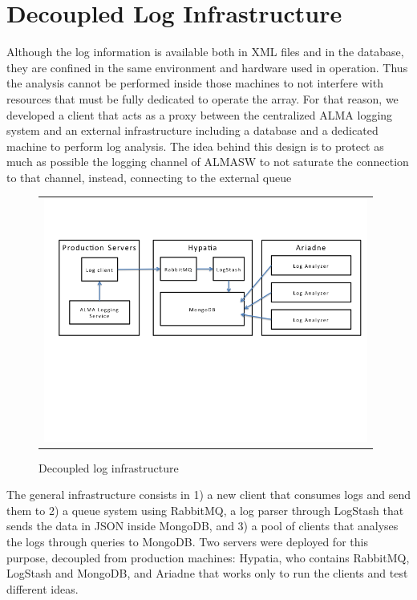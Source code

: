 \documentclass[]{spie}  %
\begin{document}
\section{Decoupled Log Infrastructure}
Although the log information is available both in XML files and in the
database, they are confined in the same environment and hardware used in
operation. Thus the analysis cannot be performed inside those machines to not
interfere with resources that must be fully dedicated to operate the array. For
that reason, we developed a client that acts as a proxy between the centralized
ALMA logging system and an external infrastructure including a database and a
dedicated machine to perform log analysis. The idea behind this design is to
protect as much as possible the logging channel of ALMASW to not saturate the
connection to that channel, instead, connecting to the external queue

   \begin{figure}[!ht]
   \begin{center}
   \begin{tabular}{c}
   \includegraphics[height=8.0cm]{../img/image1-decoupled.png}
   \end{tabular}
   \end{center}
   \caption[dc] 
   { \label{fig:dc} Decoupled log infrastructure}
   \end{figure} 


The general infrastructure consists in 1) a new client that consumes logs and
send them to 2) a queue system using RabbitMQ\cite{RabbitMQ}, a log parser through 
LogStash\cite{LogStash} that sends the data in JSON inside MongoDB\cite{mongo}, and 3) a pool of clients that
analyses the logs through queries to MongoDB. Two servers were deployed for
this purpose, decoupled from production machines: Hypatia, who contains
RabbitMQ, LogStash and MongoDB, and Ariadne that works only to run the clients
and test different ideas.
\end{document}

